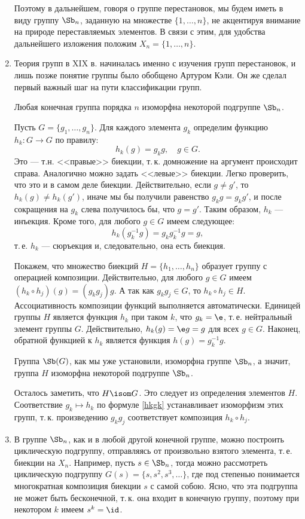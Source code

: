 \begin{enumerate}
Поэтому в дальнейшем, говоря о группе перестановок, мы будем иметь в виду группу $\Sb_n$, заданную на множестве  $\{1,\dots,n\}$, не акцентируя внимание на природе переставляемых элементов. В связи с этим, для удобства дальнейшего изложения положим $X_n=\{1,\dots,n\}$.
\item Теория групп в XIX в. начиналась именно с изучения групп перестановок, и лишь позже понятие группы было обобщено Артуром Кэли. Он же сделал первый важный шаг на пути классификации групп.
\begin{thrm}[Кэли]
Любая конечная группа порядка $n$ изоморфна некоторой подгруппе $\Sb_n$.
\end{thrm}
\pf 
Пусть $G=\{g_1,\dots,g_n\}$. Для каждого элемента $g_k$ определим функцию $h_k:G\to G$ по правилу:
\begin{equation}\label{hkgk}
h_k(g)=g_kg,\quad g\in G.
\end{equation}
Это --- т.н. <<правые>> биекции, т.\,к. домножение на аргумент происходит справа. Аналогично можно задать <<левые>> биекции. Легко проверить, что это и в самом деле биекции. Действительно, если $g\ne g'$, то
$h_k(g)\ne h_k(g')$, иначе мы бы получили равенство $g_kg=g_kg'$, и после сокращения на $g_k$ слева получилось бы, что $g=g'$. Таким образом, $h_k$ --- инъекция. Кроме того, для любого $g\in G$ имеем следующее:
$$
h_k(g_k^{-1}g) = g_kg_k^{-1}g=g,
$$
т.\,е. $h_k$ --- сюръекция и, следовательно, она есть биекция.

Покажем, что множество биекций $H=\{h_1,\dots,h_n\}$ образует группу с операцией композиции. Действительно, 
для любого $g\in G$ имеем $(h_k\circ h_j)(g) = (g_kg_j)g$. А так как $g_kg_j\in G$, то $h_k\circ h_j\in H$. 
Ассоциативность композиции функций выполняется автоматически. Единицей группы $H$ является функция $h_k$ при таком $k$, что $g_k=\e$, т.\,е. нейтральный элемент группы $G$. Действительно, $h_k(g)=\e g=g$ для всех $g\in G$.
Наконец, обратной функцией к $h_k$ является функция $h(g)=g_k^{-1}g$.

Группа $\Sb(G)$, как мы уже установили, изоморфна группе $\Sb_n$, а значит, группа $H$ изоморфна некоторой подгруппе $\Sb_n$.

Осталось заметить, что $H\isom G$. Это следует из определения элементов $H$. Соответствие $g_k\mapsto h_k$ по формуле \eqref{hkgk} устанавливает изоморфизм этих групп, т.\,к. произведению $g_kg_j$ соответствует композиция $h_k\circ h_j$.
\epf

\item В группе $\Sb_n$, как и в любой другой конечной группе, можно построить циклическую подгруппу, отправляясь от произвольно взятого элемента, т.\,е. биекции на $X_n$. Например, пусть $s\in\Sb_n$, тогда можно рассмотреть циклическую подгруппу $G(s)=\{s,s^2,s^3,\dots\}$, где под степенью понимается многократная композиция биекции $s$ с самой собою. Ясно, что эта подгруппа не может быть бесконечной, т.\,к. она входит в конечную группу, поэтому при некотором $k$ имеем $s^k=\id$.


\end{enumerate}

